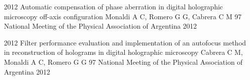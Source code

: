 \documentclass[11pt,a4paper]{moderncv}
\begin{document}
        \cventry                                                                                                  %
            {2012}                                                                                                %
            {                                                                                                     %
                Automatic compensation of phase aberration in digital                                             %
                    holographic microscopy off-axis configuration                                                 %
            }                                                                                                     %
            {                                                                                                     %
                Monaldi A C, Romero G G, Cabrera C M                                                              %
            }                                                                                                     %
            {97 National Meeting of the Physical Association of Argentina}                                        %
            {2012}                                                                                                %
            {}                                                                                                    %

        \cventry                                                                                                  %
            {2012}                                                                                                %
            {                                                                                                     %
                Filter performance evaluation and implementation of an                                            %
                autofocus method in reconstruction of holograms in digital                                        %
                holographic microscopy                                                                            %
            }                                                                                                     %
            {Cabrera C M, Monaldi A C, Romero G G}                                                                %
            {97 National Meeting of the Physical Association of Argentina}                                        %
            {2012}                                                                                                %
            {}                                                                                                    %
\end{document}
